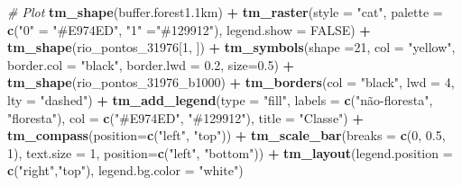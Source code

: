 \documentclass[
]{article}
\newenvironment{Shaded}{\begin{snugshade}}{\end{snugshade}}
\newcommand{\AttributeTok}[1]{\textcolor[rgb]{0.13,0.29,0.53}{#1}}
\newcommand{\CommentTok}[1]{\textcolor[rgb]{0.56,0.35,0.01}{\textit{#1}}}
\newcommand{\ConstantTok}[1]{\textcolor[rgb]{0.56,0.35,0.01}{#1}}
\newcommand{\DecValTok}[1]{\textcolor[rgb]{0.00,0.00,0.81}{#1}}
\newcommand{\FloatTok}[1]{\textcolor[rgb]{0.00,0.00,0.81}{#1}}
\newcommand{\FunctionTok}[1]{\textcolor[rgb]{0.13,0.29,0.53}{\textbf{#1}}}
\newcommand{\NormalTok}[1]{#1}
\newcommand{\OtherTok}[1]{\textcolor[rgb]{0.56,0.35,0.01}{#1}}
\newcommand{\SpecialCharTok}[1]{\textcolor[rgb]{0.81,0.36,0.00}{\textbf{#1}}}
\newcommand{\StringTok}[1]{\textcolor[rgb]{0.31,0.60,0.02}{#1}}
\begin{document}
\begin{Shaded}
\begin{Highlighting}[]
\CommentTok{\# Plot}
\FunctionTok{tm\_shape}\NormalTok{(buffer.forest1}\FloatTok{.1}\NormalTok{km) }\SpecialCharTok{+}
  \FunctionTok{tm\_raster}\NormalTok{(}\AttributeTok{style =} \StringTok{"cat"}\NormalTok{, }
            \AttributeTok{palette =} \FunctionTok{c}\NormalTok{(}\StringTok{"0"} \OtherTok{=} \StringTok{"\#E974ED"}\NormalTok{, }
                        \StringTok{"1"} \OtherTok{=}\StringTok{"\#129912"}\NormalTok{), }\AttributeTok{legend.show =} \ConstantTok{FALSE}\NormalTok{) }\SpecialCharTok{+} 
\FunctionTok{tm\_shape}\NormalTok{(rio\_pontos\_31976[}\DecValTok{1}\NormalTok{, ]) }\SpecialCharTok{+} 
  \FunctionTok{tm\_symbols}\NormalTok{(}\AttributeTok{shape =}\DecValTok{21}\NormalTok{, }\AttributeTok{col =} \StringTok{"yellow"}\NormalTok{, }
            \AttributeTok{border.col =} \StringTok{"black"}\NormalTok{, }\AttributeTok{border.lwd =} \FloatTok{0.2}\NormalTok{, }\AttributeTok{size=}\FloatTok{0.5}\NormalTok{) }\SpecialCharTok{+} 
\FunctionTok{tm\_shape}\NormalTok{(rio\_pontos\_31976\_b1000) }\SpecialCharTok{+}
  \FunctionTok{tm\_borders}\NormalTok{(}\AttributeTok{col =} \StringTok{"black"}\NormalTok{, }\AttributeTok{lwd =} \DecValTok{4}\NormalTok{, }\AttributeTok{lty =} \StringTok{"dashed"}\NormalTok{) }\SpecialCharTok{+} 
\FunctionTok{tm\_add\_legend}\NormalTok{(}\AttributeTok{type =} \StringTok{"fill"}\NormalTok{,  }\AttributeTok{labels =} \FunctionTok{c}\NormalTok{(}\StringTok{"não{-}floresta"}\NormalTok{, }\StringTok{"floresta"}\NormalTok{),}
    \AttributeTok{col =} \FunctionTok{c}\NormalTok{(}\StringTok{"\#E974ED"}\NormalTok{, }\StringTok{"\#129912"}\NormalTok{), }\AttributeTok{title =} \StringTok{"Classe"}\NormalTok{) }\SpecialCharTok{+} 
\FunctionTok{tm\_compass}\NormalTok{(}\AttributeTok{position=}\FunctionTok{c}\NormalTok{(}\StringTok{"left"}\NormalTok{, }\StringTok{"top"}\NormalTok{)) }\SpecialCharTok{+}
\FunctionTok{tm\_scale\_bar}\NormalTok{(}\AttributeTok{breaks =} \FunctionTok{c}\NormalTok{(}\DecValTok{0}\NormalTok{, }\FloatTok{0.5}\NormalTok{, }\DecValTok{1}\NormalTok{), }\AttributeTok{text.size =} \DecValTok{1}\NormalTok{, }
             \AttributeTok{position=}\FunctionTok{c}\NormalTok{(}\StringTok{"left"}\NormalTok{, }\StringTok{"bottom"}\NormalTok{)) }\SpecialCharTok{+}
\FunctionTok{tm\_layout}\NormalTok{(}\AttributeTok{legend.position =} \FunctionTok{c}\NormalTok{(}\StringTok{"right"}\NormalTok{,}\StringTok{"top"}\NormalTok{), }\AttributeTok{legend.bg.color =} \StringTok{"white"}\NormalTok{)}
\end{Highlighting}
\end{Shaded}
\end{document}
